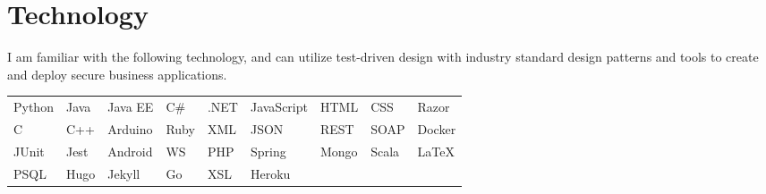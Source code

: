 \documentclass[]{rcf_cv}
\begin{document}
	\section{Technology}
	
		I am familiar with the following technology, and can utilize test-driven design with industry standard design patterns and tools to create and deploy secure business applications. \\
	
	\begin{tabular}{l l l l l l l l l}
		Python & Java & Java EE & C\# & .NET & JavaScript & HTML & CSS & Razor \\
		
		C & C++ & Arduino & Ruby & XML & JSON & REST & SOAP & Docker \\
		
		JUnit & Jest & Android & WS & PHP & Spring & Mongo & Scala & \LaTeX \\
		
		PSQL & Hugo & Jekyll & Go & XSL & Heroku
		
	\end{tabular}
	
\end{document}
